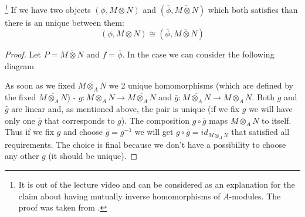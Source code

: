\begin{lemma}
  \footnote{
    It is out of the lecture video and can be considered as an
    explanation for the claim about having mutually inverse
    homomorphisms of $A$-modules. The proof was taken from
    \cite{bib:KeithConradTensorProduct1}.
  }
  If we have two objects $\left(\phi, M \otimes N\right)$
  and $\left(\overline{\phi},\overline{M \otimes N}\right)$
  which both satisfies  than there is
  an unique  between them: 
  \[
  \left(\phi, M \otimes N\right) \cong \left(\overline{\phi},
  \overline{M \otimes N}\right)
  \]
\begin{proof}
Let $P = \overline{M \otimes N}$ and $f =
\overline{\phi}$. In 
the case we can consider the following diagram


As soon as we fixed $\overline{ M \otimes_A N}$
we 2 unique homomorphisms (which are defined by the fixed
$\overline{ M \otimes_A N}$) - 
$g :  M \otimes_A N \to \overline{ M \otimes_A N}$
and
$\bar{g} :  \overline{M \otimes_A N} \to M \otimes_A N$.
Both $g$ and $\bar{g}$ are linear and, as mentioned above, the pair is
unique (if we fix $g$ we will have only one $\bar{g}$ that corresponds
to $g$). The composition $g \circ \bar{g}$ maps $M \otimes_A N$ to
itself. Thus if we fix $g$ and choose $\bar{g} = g^{-1}$ we will get
$g \circ \bar{g} = id_{M \otimes_A N}$ that satisfied all
requirements. The choice is final because we don't have a possibility
to choose any other $\bar{g}$ (it should be unique).


\end{proof}
\end{lemma}
